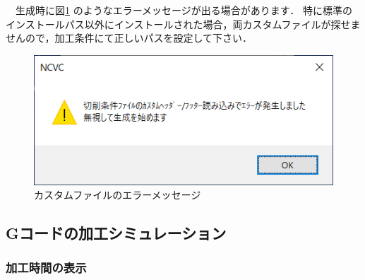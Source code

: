 　生成時に図\ref{fig:error.png} のようなエラーメッセージが出る場合があります．
特に標準のインストールパス以外にインストールされた場合，両カスタムファイルが探せませんので，加工条件にて正しいパスを設定して下さい．

\begin{figure}[H]
\centering
\includegraphics{No2/fig/error.png}
\caption{カスタムファイルのエラーメッセージ}
\label{fig:error.png}
\end{figure}

\subsection{Gコードの加工シミュレーション}

\subsubsection{加工時間の表示}


